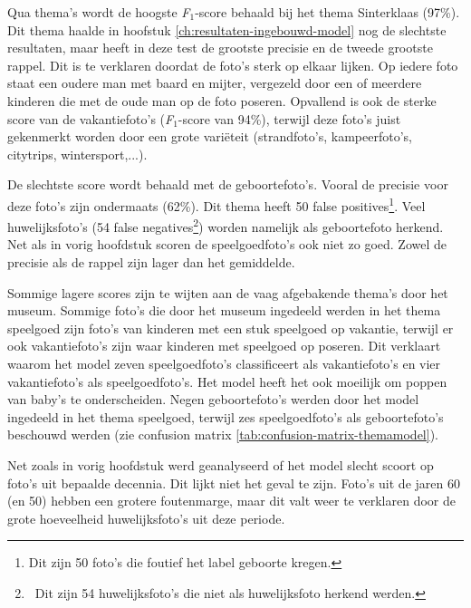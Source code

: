 Qua thema’s wordt de hoogste \textit{F$_{1}$}-score behaald bij het thema Sinterklaas (97\%). Dit thema haalde in hoofstuk \ref{ch:resultaten-ingebouwd-model} nog de slechtste resultaten, maar heeft in deze test de grootste precisie en de tweede grootste rappel. Dit is te verklaren doordat de foto’s sterk op elkaar lijken. Op iedere foto staat een oudere man met baard en mijter, vergezeld door een of meerdere kinderen die met de oude man op de foto poseren. Opvallend is ook de sterke score van de vakantiefoto’s (\textit{F$_{1}$}-score van 94\%), terwijl deze foto’s juist gekenmerkt worden door een grote variëteit (strandfoto’s, kampeerfoto’s, citytrips, wintersport,...).

De slechtste score wordt behaald met de geboortefoto’s. Vooral de precisie voor deze foto’s zijn ondermaats (62\%). Dit thema heeft 50 false positives\footnote{Dit zijn 50 foto's die foutief het label geboorte kregen.}. Veel huwelijksfoto’s (54 false negatives\footnote{~Dit zijn 54 huwelijksfoto's die niet als huwelijksfoto herkend werden.}) worden namelijk als geboortefoto herkend.  Net als in vorig hoofdstuk scoren de speelgoedfoto’s ook niet zo goed. Zowel de precisie als de rappel zijn lager dan het gemiddelde.

Sommige lagere scores zijn te wijten aan de vaag afgebakende thema’s door het museum. Sommige foto’s die door het museum ingedeeld werden in het thema speelgoed zijn  foto’s van kinderen met een stuk speelgoed op vakantie, terwijl er ook vakantiefoto’s zijn waar kinderen met speelgoed op poseren. Dit verklaart waarom het model zeven speelgoedfoto’s classificeert als vakantiefoto’s en vier vakantiefoto’s als speelgoedfoto’s. Het model heeft het ook moeilijk om poppen van baby’s te onderscheiden. Negen geboortefoto’s werden door het model ingedeeld in het thema speelgoed, terwijl zes speelgoedfoto’s als geboortefoto’s beschouwd werden (zie confusion matrix \ref{tab:confusion-matrix-themamodel}).

Net zoals in vorig hoofdstuk werd geanalyseerd of het model slecht scoort op foto’s uit bepaalde decennia. Dit lijkt niet het geval te zijn. Foto’s uit de jaren 60 (en 50) hebben een grotere foutenmarge, maar dit valt weer te verklaren door de grote hoeveelheid huwelijksfoto’s uit deze periode.

